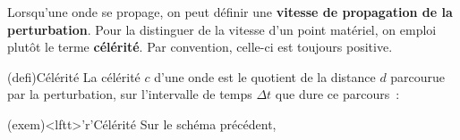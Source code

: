 \documentclass[../../main/main.tex]{subfiles}
\begin{document}
Lorsqu'une onde se propage, on peut définir une \textbf{vitesse de propagation
	de la perturbation}. Pour la distinguer de la vitesse d'un point matériel, on
emploi plutôt le terme \textbf{célérité}. Par convention, celle-ci est toujours
positive.
\smallbreak
\noindent
\begin{minipage}[c]{.65\linewidth}
	\begin{tcb}(defi){Célérité}
		La célérité $c$ d'une onde est le quotient de la distance $d$ parcourue
		par la perturbation, sur l'intervalle de temps $\Delta t$ que dure ce
		parcours~:
		\psw{%
			\[\boxed{c = \frac{d}{\Delta t}}\]
		}
		\vspace{-15pt}
	\end{tcb}
\end{minipage}
\noindent
\begin{minipage}[c]{.45\linewidth}
	\begin{tcb}(exem)<lftt>'r'{Célérité}
		Sur le schéma précédent,
		\psw{%
			\[
				\boxed{c = \frac{x_2-x_1}{t_2-t_1}}
			\]
		}%
		\vspace{-15pt}
	\end{tcb}
\end{minipage}
\smallbreak

\end{document}
